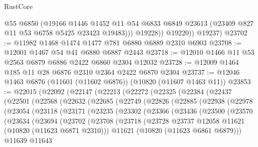 \begin{lexlean}{RustCore}
\begin{coremodule}
                @55
                @6850
                (@19166
                  @1446
                  @1452
                  @11
                  @54
                  @6833
                  @6849
                  @23613
                  (@23409 @827 @11 @53 @6758 @5425 @23423 @19483)))
              @19228))
          @19220))
      @19237)
@23702 := @11982 @1468 @1474 @1477 @781 @6880 @6889 @2310 @6903
@23708 := @12001 @1467 @54 @41 @6880 @6887 @2443
@23718 := @12010 @1466 @11 @53 @2563 @6879 @6886 @2422 @6860 @2304 @12032
@23728 := @12009 @1464 @185 @11 @28 @6876 @2310 @2364 @2422 @6870 @2304
@23737 := @12046 @1463 @6876 (@11601 (@11602 @6876)) (@10820 (@11607 @1463 @11))
@23853 := @22015
    (@22092
      (@22147
        (@22213
          (@22272
            (@22325
              (@22384
                (@22437
                  (@22501
                    (@22568
                      (@22632
                        (@22685
                          (@22749
                            (@22826
                              (@22885
                                (@22938
                                  (@22978
                                    (@23054
                                      (@23118
                                        (@23171
                                          (@23235
                                            (@23302
                                              (@23366
                                                (@23436
                                                  (@23500
                                                    (@23570
                                                      (@23634
                                                        (@23694
                                                          (@23702
                                                            (@23708
                                                              (@23718
                                                                (@23728
                                                                  @23737
                                                                  @12058
                                                                  @11621
                                                                  (@10820 (@11623 @6871 @2310)))
                                                                @11621
                                                                (@10820 (@11623 @6861 @6879)))
                                                              @11639
                                                              @11643

\end{coremodule}
\end{lexlean}

